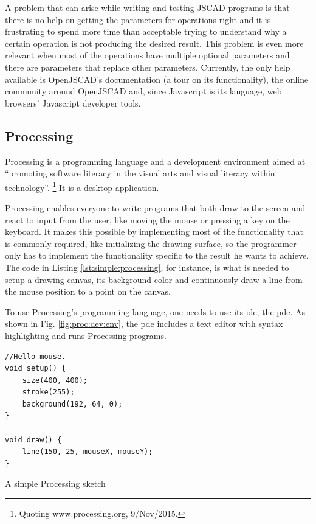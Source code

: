 A problem that can arise while writing and testing JSCAD programs is that there is no help on getting the parameters for operations right and it is frustrating to spend more time than acceptable trying to understand why a certain operation is not producing the desired result.
This problem is even more relevant when most of the operations have multiple optional parameters and there are parameters that replace other parameters.
Currently, the only help available is OpenJSCAD's documentation (a tour on its functionality), the online community around OpenJSCAD and, since Javascript is its language, web browsers' Javascript developer tools.


\subsection{Processing}
\label{section:processing:related}
Processing\cite{reas2007processing} is a programming language and a development environment aimed at ``promoting software literacy in the visual arts and visual literacy within technology''.%
\footnote{Quoting www.processing.org, 9/Nov/2015.}
It is a desktop application.

Processing enables everyone to write programs that both draw to the screen and react to input from the user, like moving the mouse or pressing a key on the keyboard.
It makes this possible by implementing most of the functionality that is commonly required, like initializing the drawing surface, so the programmer only has to implement the functionality specific to the result he wants to achieve.
The code in Listing \ref{lst:simple:processing}, for instance, is what is needed to setup a drawing canvas, its background color and continuously draw a line from the mouse position to a point on the canvas.

To use Processing's programming language, one needs to use its \gls{ide}, the \acrfull{pde}.
As shown in Fig. \ref{fig:proc:dev:env}, the \gls{pde} includes a text editor with syntax highlighting and runs Processing programs.

\begin{listing}
\begin{verbatim}
//Hello mouse.
void setup() {
	size(400, 400);
	stroke(255);
	background(192, 64, 0);
}

void draw() {
	line(150, 25, mouseX, mouseY);
}
\end{verbatim}
	\caption[A simple Processing sketch]{A simple Processing sketch}
	\label{lst:simple:processing}
\end{listing}

